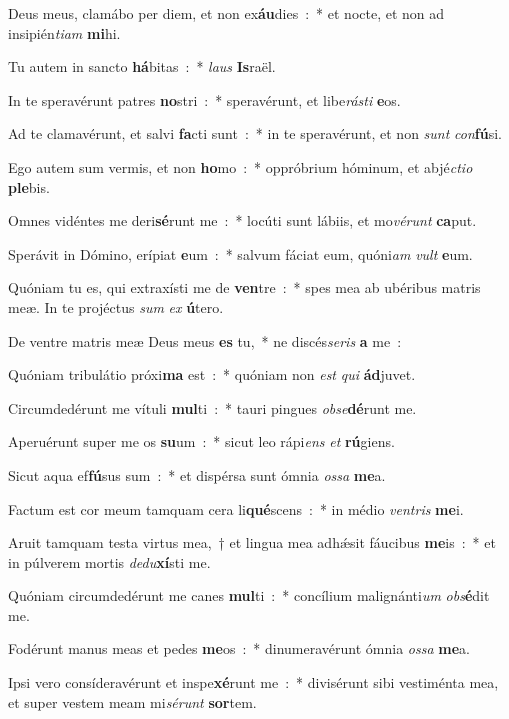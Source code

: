 ﻿\item Deus meus, clamábo per diem, et non ex\textbf{áu}dies~:~* et nocte, et non ad insipién\emph{ti}\emph{am} \textbf{mi}hi.
\item Tu autem in sancto \textbf{há}bitas~:~* \emph{laus} \textbf{Is}raël.
\item In te speravérunt patres \textbf{no}stri~:~* speravérunt, et libe\emph{rá}\emph{sti} \textbf{e}os.
\item Ad te clamavérunt, et salvi \textbf{fa}cti sunt~:~* in te speravérunt, et non \emph{sunt} \emph{con}\textbf{fú}si.
\item Ego autem sum vermis, et non \textbf{ho}mo~:~* oppróbrium hóminum, et abjé\emph{cti}\emph{o} \textbf{ple}bis.
\item Omnes vidéntes me deri\textbf{sé}runt me~:~* locúti sunt lábiis, et mo\emph{vé}\emph{runt} \textbf{ca}put.
\item Sperávit in Dómino, erípiat \textbf{e}um~:~* salvum fáciat eum, quóni\emph{am} \emph{vult} \textbf{e}um.
\item Quóniam tu es, qui extraxísti me de \textbf{ven}tre~:~* spes mea ab ubéribus matris meæ. In te projéctus \emph{sum} \emph{ex} \textbf{ú}tero.
\item De ventre matris meæ Deus meus \textbf{es} tu,~* ne discés\emph{se}\emph{ris} \textbf{a} me~:
\item Quóniam tribulátio próxi\textbf{ma} est~:~* quóniam non \emph{est} \emph{qui} \textbf{ád}juvet.
\item Circumdedérunt me vítuli \textbf{mul}ti~:~* tauri pingues \emph{obs}\emph{e}\textbf{dé}runt me.
\item Aperuérunt super me os \textbf{su}um~:~* sicut leo rápi\emph{ens} \emph{et} \textbf{rú}giens.
\item Sicut aqua ef\textbf{fú}sus sum~:~* et dispérsa sunt ómnia \emph{os}\emph{sa} \textbf{me}a.
\item Factum est cor meum tamquam cera li\textbf{qué}scens~:~* in médio \emph{ven}\emph{tris} \textbf{me}i.
\item Aruit tamquam testa virtus mea,~† et lingua mea adhǽsit fáucibus \textbf{me}is~:~* et in púlverem mortis \emph{de}\emph{du}\textbf{xí}sti me.
\item Quóniam circumdedérunt me canes \textbf{mul}ti~:~* concílium malignánti\emph{um} \emph{obs}\textbf{é}dit me.
\item Fodérunt manus meas et pedes \textbf{me}os~:~* dinumeravérunt ómnia \emph{os}\emph{sa} \textbf{me}a.
\item Ipsi vero consíderavérunt et inspe\textbf{xé}runt me~:~* divisérunt sibi vestiménta mea, et super vestem meam mi\emph{sé}\emph{runt} \textbf{sor}tem.
